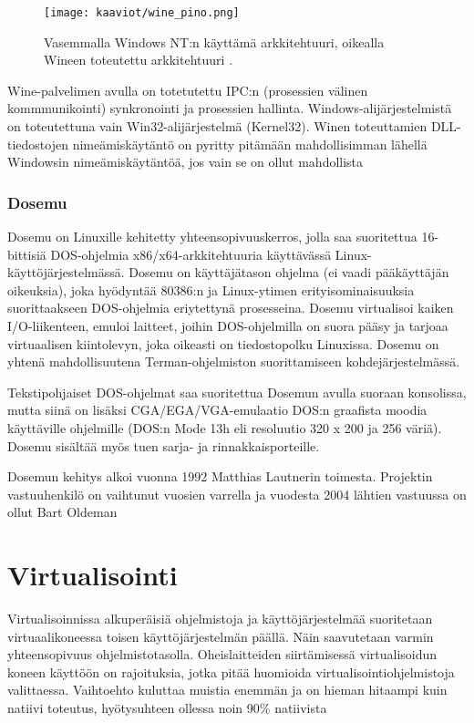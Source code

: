 \begin{figure}[H]
\centering
\texttt{[image: kaaviot/wine\_pino.png]}
\caption{Vasemmalla Windows NT:n käyttämä arkkitehtuuri, oikealla Wineen toteutettu arkkitehtuuri \cite{wine:winnt_architecture,wine:architecture}. }
\label{wine_pino}
\end{figure}

Wine-palvelimen avulla on totetutettu IPC:n (prosessien välinen kommmunikointi) synkronointi ja prosessien hallinta. Windows-alijärjestelmistä on toteutettuna vain Win32-alijärjestelmä (Kernel32). Winen toteuttamien DLL-tiedostojen nimeämiskäytäntö on pyritty pitämään mahdollisimman lähellä Windowsin nimeämiskäytäntöä, jos vain se on ollut mahdollista \citep{wine:architecture}

\subsubsection{Dosemu}
Dosemu on Linuxille kehitetty yhteensopivuuskerros, jolla saa suoritettua 16-bittisiä DOS-ohjelmia x86/x64-arkkitehtuuria käyttävässä Linux-käyttöjärjestelmässä. Dosemu on käyttäjätason ohjelma (ei vaadi pääkäyttäjän oikeuksia), joka hyödyntää 80386:n ja Linux-ytimen erityisominaisuuksia suorittaakseen DOS-ohjelmia eriytettynä prosesseina. Dosemu virtualisoi kaiken I/O-liikenteen, emuloi laitteet, joihin DOS-ohjelmilla on suora pääsy ja tarjoaa virtuaalisen kiintolevyn, joka oikeasti on tiedostopolku Linuxissa. Dosemu on yhtenä mahdollisuutena Terman-ohjelmiston suorittamiseen kohdejärjestelmässä.

Tekstipohjaiset DOS-ohjelmat saa suoritettua Dosemun avulla suoraan konsolissa, mutta siinä on lisäksi CGA/EGA/VGA-emulaatio DOS:n graafista moodia käyttäville ohjelmille (DOS:n Mode 13h eli resoluutio 320 x 200 ja 256 väriä). Dosemu sisältää myös tuen sarja- ja rinnakkaisporteille.

Dosemun kehitys alkoi vuonna 1992 Matthias Lautnerin toimesta. Projektin vastuuhenkilö on vaihtunut vuosien varrella ja vuodesta 2004 lähtien vastuussa on ollut Bart Oldeman \citep{dosemu:history}




\section{Virtualisointi}
Virtualisoinnissa alkuperäisiä ohjelmistoja ja käyttöjärjestelmää suoritetaan virtuaalikoneessa toisen käyttöjärjestelmän päällä. Näin saavutetaan varmin yhteensopivuus ohjelmistotasolla. Oheislaitteiden siirtämisessä virtualisoidun koneen käyttöön on rajoituksia, jotka pitää huomioida virtualisointiohjelmistoja valittaessa. Vaihtoehto kuluttaa muistia enemmän ja on hieman hitaampi kuin natiivi toteutus, hyötysuhteen ollessa noin 90\%  natiivista \citep{virtnat_anadtech}

